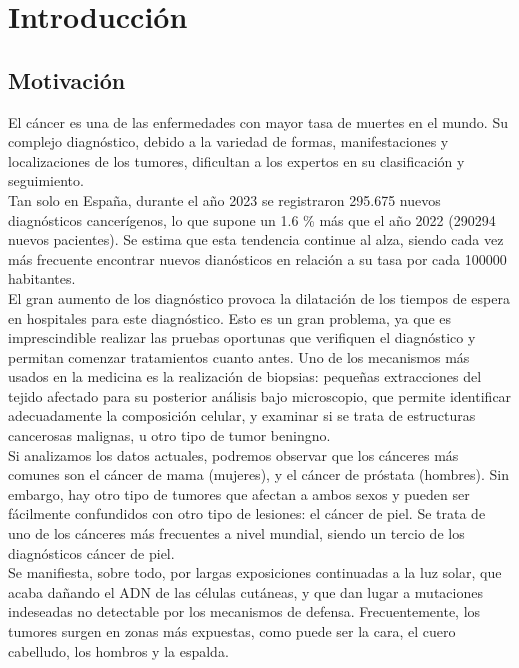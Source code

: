 \chapter{Introducción}

 \section{Motivación}
El cáncer es una de las enfermedades con mayor tasa de muertes en el mundo. Su complejo diagnóstico, debido a la variedad de formas, manifestaciones y localizaciones de los tumores, dificultan a los expertos en su clasificación y seguimiento.\\

Tan solo en España, durante el año 2023 se registraron 295.675 nuevos diagnósticos cancerígenos, lo que supone un 1.6 \% más que el año 2022 (290294 nuevos pacientes). Se estima que esta tendencia continue al alza, siendo cada vez más frecuente encontrar nuevos dianósticos en relación a su tasa por cada 100000 habitantes.\\

El gran aumento de los diagnóstico provoca la dilatación de los tiempos de espera en hospitales para este diagnóstico. Esto es un gran problema, ya que es imprescindible realizar las pruebas oportunas que verifiquen el diagnóstico y permitan comenzar tratamientos cuanto antes. Uno de los mecanismos más usados en la medicina es la realización de biopsias: pequeñas extracciones del tejido afectado para su posterior análisis bajo microscopio, que permite identificar adecuadamente la composición celular, y examinar si se trata de estructuras cancerosas malignas, u otro tipo de tumor beningno.\\

Si analizamos los datos actuales, podremos observar que los cánceres más comunes son el cáncer de mama (mujeres), y el cáncer de próstata (hombres). Sin embargo, hay otro tipo de tumores que afectan a ambos sexos y pueden ser fácilmente confundidos con otro tipo de lesiones: el cáncer de piel. Se trata de uno de los cánceres más frecuentes a nivel mundial, siendo un tercio de los diagnósticos cáncer de piel. \\

Se manifiesta, sobre todo, por largas exposiciones continuadas a la luz solar, que acaba dañando el ADN de las células cutáneas, y que dan lugar a mutaciones indeseadas no detectable por los mecanismos de defensa. Frecuentemente, los tumores surgen en zonas más expuestas, como puede ser la cara, el cuero cabelludo, los hombros y la espalda. \\

